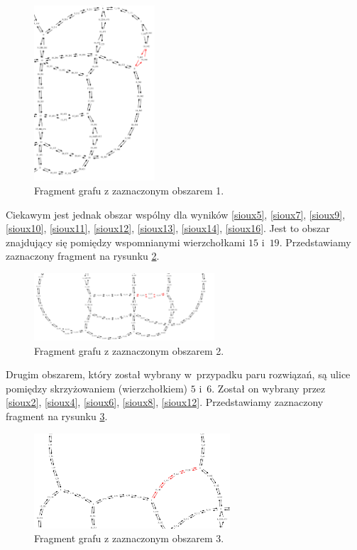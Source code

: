 \documentclass[twoside,12pt]{report}
\begin{document}
\begin{figure}[ht]
\centering
\includegraphics[width=0.4\textwidth, angle=90]{img/sioux-out/obszar1}
\caption{Fragment grafu z zaznaczonym obszarem 1.}
\label{frag_1}
\end{figure}

Ciekawym jest jednak obszar wspólny dla wyników \ref{sioux5}, \ref{sioux7}, \ref{sioux9}, \ref{sioux10}, \ref{sioux11}, \ref{sioux12}, \ref{sioux13}, \ref{sioux14}, \ref{sioux16}. Jest to obszar znajdujący się pomiędzy wspomnianymi wierzchołkami $15$ i~$19$. Przedstawiamy zaznaczony fragment na rysunku \ref{frag_2}.

\begin{figure}[ht]
\centering
\includegraphics[width=0.60\textwidth]{img/sioux-out/obszar2}
\caption{Fragment grafu z zaznaczonym obszarem 2.}
\label{frag_2}
\end{figure}

Drugim obszarem, który został wybrany w~przypadku paru rozwiązań, są ulice pomiędzy skrzyżowaniem (wierzchołkiem) $5$ i~$6$. Został on wybrany przez \ref{sioux2}, \ref{sioux4}, \ref{sioux6}, \ref{sioux8}, \ref{sioux12}. Przedstawiamy zaznaczony fragment na rysunku \ref{frag_3}.

\begin{figure}[ht]
\centering
\includegraphics[width=0.65\textwidth]{img/sioux-out/obszar3}
\caption{Fragment grafu z zaznaczonym obszarem 3.}
\label{frag_3}
\end{figure}
\end{document}
